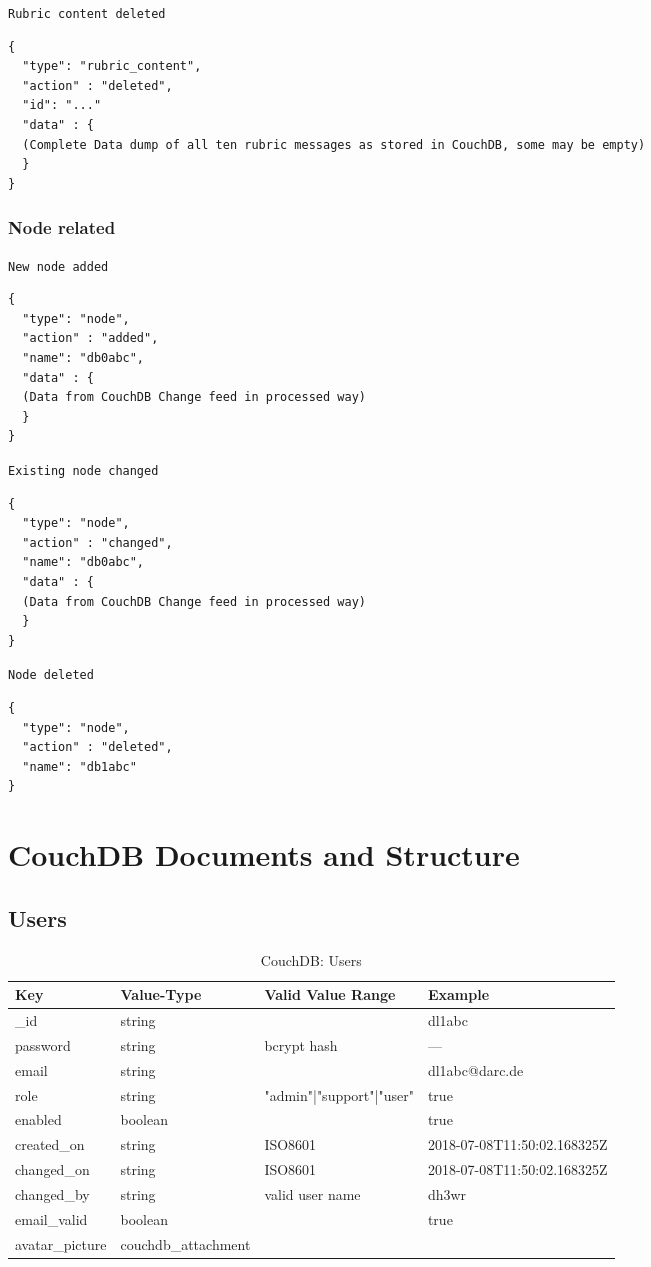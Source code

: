 \texttt{Rubric content deleted}
\begin{lstlisting}
{
  "type": "rubric_content",
  "action" : "deleted",
  "id": "..."
  "data" : {
  (Complete Data dump of all ten rubric messages as stored in CouchDB, some may be empty)
  }
}
\end{lstlisting}


\subsubsection{Node related}
\texttt{New node added}
\begin{lstlisting}
{
  "type": "node",
  "action" : "added",
  "name": "db0abc",
  "data" : {
  (Data from CouchDB Change feed in processed way)
  }
}
\end{lstlisting}

\texttt{Existing node changed}
\begin{lstlisting}
{
  "type": "node",
  "action" : "changed",
  "name": "db0abc",
  "data" : {
  (Data from CouchDB Change feed in processed way)
  }
}
\end{lstlisting}

\texttt{Node deleted}
\begin{lstlisting}
{
  "type": "node",
  "action" : "deleted",
  "name": "db1abc"
}
\end{lstlisting}


\section{CouchDB Documents and Structure}

\subsection{Users}

\begin{table}[h]
 \centering
 \caption{CouchDB: Users}
 \begin{tabular}{|l|l|l|l|} \hline
  Key & Value-Type & Valid Value Range & Example \\
  \hline
  \_id & string & & dl1abc \\
  password & string & bcrypt hash & --- \\
  email & string & & dl1abc@darc.de \\
  role & string & "admin"|"support"|"user" & true \\
  enabled & boolean & & true \\
  created\_on & string & ISO8601 & 2018-07-08T11:50:02.168325Z \\
  changed\_on & string & ISO8601 & 2018-07-08T11:50:02.168325Z \\
  changed\_by & string & valid user name & dh3wr \\
  email\_valid & boolean & & true \\
  avatar\_picture & couchdb\_attachment & & \\ \hline
  \end{tabular}
  \label{tab:couchdb:users}
\end{table}

